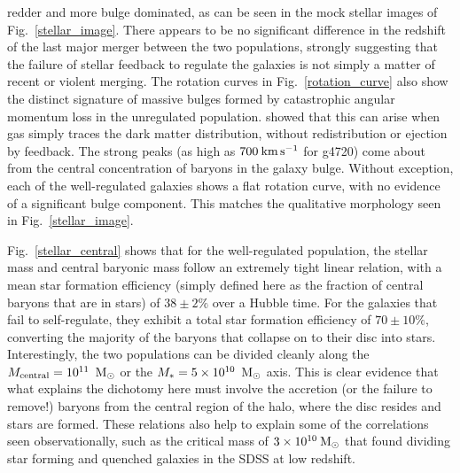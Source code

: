 redder and more bulge dominated, as can be seen in the mock stellar images of
Fig.~\ref{stellar_image}.  There appears to be no significant difference in
the redshift of the last major merger between the two populations, strongly
suggesting that the failure of stellar feedback to regulate the galaxies is not
simply a matter of recent or violent merging.  The rotation curves in
Fig.~\ref{rotation_curve} also show the distinct signature of massive bulges
formed by catastrophic angular momentum loss in the unregulated population.
\citet{vanDenBosch2001} showed that this can arise when gas simply traces the
dark matter distribution, without redistribution or ejection by feedback.  The
strong peaks (as high as $700\>{\rm km}\,{\rm s}^{-1}$ for g4720) come about from the central
concentration of baryons in the galaxy bulge.  Without exception, each of the
well-regulated galaxies shows a flat rotation curve, with no evidence of a
significant bulge component.  This matches the qualitative morphology seen in
Fig.~\ref{stellar_image}.

Fig.~\ref{stellar_central} shows that for the well-regulated population, the
stellar mass and central baryonic mass follow an extremely tight linear
relation, with a mean star formation efficiency (simply defined here as the
fraction of central baryons that are in stars) of $38\pm2\%$ over a Hubble time.
For the galaxies that fail to self-regulate, they exhibit a total star formation
efficiency of $70\pm10\%$, converting the majority of the baryons that collapse
on to their disc into stars.  Interestingly, the two populations can be divided
cleanly along the $M_{\rm central}=10^{11}\;\>{\rm M_{\odot}}$ or the
$M_*=5\times10^{10}\;\>{\rm M_{\odot}}$ axis.  This is clear evidence that what explains
the dichotomy here must involve the accretion (or the failure to remove!)
baryons from the central region of the halo, where the disc resides and stars
are formed.  These relations also help to explain some of the correlations seen
observationally, such as the critical mass of $3\times10^{10}\>{\rm M_{\odot}}$ that 
\citet{Kauffmann2003a} found dividing star forming and quenched galaxies in the
SDSS at low redshift.

